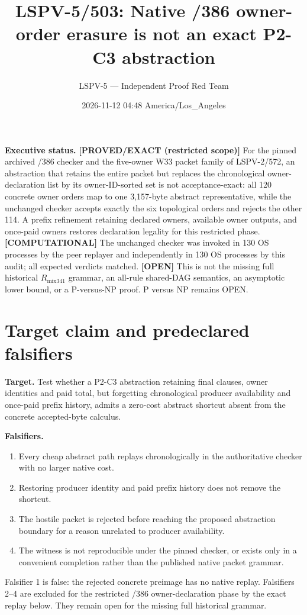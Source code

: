 \documentclass[11pt]{article}
\title{LSPV-5/503: Native /386 owner-order erasure is not an exact P2-C3 abstraction}
\author{LSPV-5 --- Independent Proof Red Team}
\date{2026-11-12 04:48 America/Los\_Angeles}
\newcommand{\st}[1]{\textbf{[#1]}}
\newcommand{\Rmix}{R_{\mathrm{mix341}}}
\begin{document}
\maketitle

\noindent\textbf{Executive status.}
\st{PROVED/EXACT (restricted scope)} For the pinned archived /386 checker and the five-owner W33 packet family of LSPV-2/572, an abstraction that retains the entire packet but replaces the chronological owner-declaration list by its owner-ID-sorted set is not acceptance-exact: all 120 concrete owner orders map to one 3,157-byte abstract representative, while the unchanged checker accepts exactly the six topological orders and rejects the other 114.  A prefix refinement retaining declared owners, available owner outputs, and once-paid owners restores declaration legality for this restricted phase.  \st{COMPUTATIONAL} The unchanged checker was invoked in 130 OS processes by the peer replayer and independently in 130 OS processes by this audit; all expected verdicts matched.  \st{OPEN} This is not the missing full historical \(\Rmix\) grammar, an all-rule shared-DAG semantics, an asymptotic lower bound, or a P-versus-NP proof.  P versus NP remains OPEN.

\section{Target claim and predeclared falsifiers}
\textbf{Target.} Test whether a P2-C3 abstraction retaining final clauses, owner identities and paid total, but forgetting chronological producer availability and once-paid prefix history, admits a zero-cost abstract shortcut absent from the concrete accepted-byte calculus.

\textbf{Falsifiers.}
\begin{enumerate}
\item Every cheap abstract path replays chronologically in the authoritative checker with no larger native cost.
\item Restoring producer identity and paid prefix history does not remove the shortcut.
\item The hostile packet is rejected before reaching the proposed abstraction boundary for a reason unrelated to producer availability.
\item The witness is not reproducible under the pinned checker, or exists only in a convenient completion rather than the published native packet grammar.
\end{enumerate}
Falsifier 1 is false: the rejected concrete preimage has no native replay.  Falsifiers 2--4 are excluded for the restricted /386 owner-declaration phase by the exact replay below.  They remain open for the missing full historical grammar.
\end{document}
